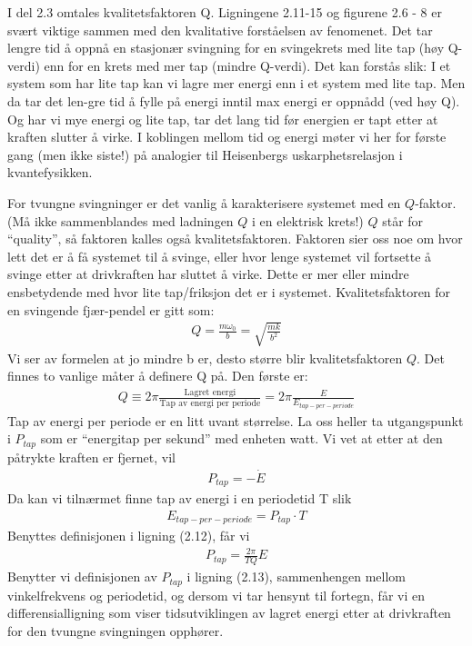 \documentclass[12pt]{article}
\numberwithin{equation}{section}
\numberwithin{figure}{section}
\newcommand{\equ}[1]{{\small\begin{align*}#1\end{align*}}}
\newcommand{\ma}[1]{$#1$}
\newcommand{\eq}[1]{{\small\begin{align}#1\end{align}}}
\begin{document}
I del 2.3 omtales kvalitetsfaktoren Q. Ligningene 2.11-15 og figurene 2.6 - 8 er svært viktige sammen med den kvalitative forståelsen av fenomenet. Det tar lengre tid å oppnå en stasjonær svingning for en svingekrets med lite tap (høy Q-verdi) enn for en krets med mer tap (mindre Q-verdi). Det kan forstås slik: I et system som har lite tap kan vi lagre mer energi enn i et system med lite tap. Men da tar det len-gre tid å fylle på energi inntil max energi er oppnådd (ved høy Q). Og har vi mye energi og lite tap, tar det lang tid før energien er tapt etter at kraften slutter å virke. I koblingen mellom tid og energi møter vi her for første gang (men ikke siste!) på analogier til Heisenbergs uskarphetsrelasjon i kvantefysikken.

\begin{tcolorbox}[title = Del 2.3 -- Kvalitetsfaktoren \ma Q,breakable]
For tvungne svingninger er det vanlig å karakterisere systemet med en \ma Q-faktor. 
(Må ikke
sammenblandes med ladningen \ma Q i en elektrisk krets!) \ma Q står for “quality”, 
så faktoren
kalles også kvalitetsfaktoren. Faktoren sier oss noe om hvor lett det er å få systemet til
å svinge, eller hvor lenge systemet vil fortsette å svinge etter at drivkraften har sluttet å
virke. Dette er mer eller mindre ensbetydende med hvor lite tap/friksjon det er i systemet.
Kvalitetsfaktoren for en svingende fjær-pendel er gitt som:
\eq{Q = \frac{m\omega_0}{b} = \sqrt{\frac{mk}
{b^2}}}
Vi ser av formelen at jo mindre b er, desto større blir kvalitetsfaktoren \ma Q.
\tcbline
Det finnes to vanlige måter å definere Q på. Den første er:
\eq{Q \equiv 2\pi
\frac{\text{Lagret energi}}{\text{Tap av energi per periode}} = 2\pi
\frac{E}
{E_{tap-per-periode}}}
\tcbline
Tap av energi per periode er en litt uvant størrelse. 
La oss heller ta utgangspunkt i \ma {P_{tap}}
som er “energitap per sekund” med enheten watt. Vi vet at etter at den påtrykte kraften
er fjernet, vil
\eq{P_{tap} = -\dot E}
\tcbline
Da kan vi tilnærmet finne tap av energi i en periodetid T slik
\equ{E_{tap-per-periode} = P_{tap} \cdot T}
\tcbline
Benyttes definisjonen i ligning (2.12), får vi
\equ{P_{tap} = \frac{2\pi}{TQ} E}
\tcbline
Benytter vi definisjonen av \ma{P_{tap}} i ligning (2.13), 
sammenhengen mellom vinkelfrekvens og
periodetid, og dersom vi tar hensynt til fortegn, 
får vi en differensialligning som viser
tidsutviklingen av lagret energi etter at 
drivkraften for den tvungne svingningen opphører.\\


\end{tcolorbox}
\end{document}
